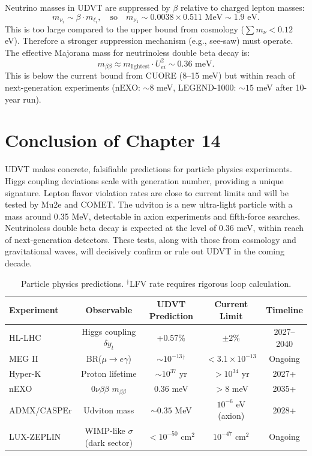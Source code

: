 \documentclass[12pt,a4paper]{book}
\theoremstyle{definition}
\theoremstyle{remark}
\begin{document}
Neutrino masses in UDVT are suppressed by $\beta$ relative to charged lepton masses:
\begin{equation}
    m_{\nu_i} \sim \beta \cdot m_{\ell_i}, \quad \text{so} \quad m_{\nu_1} \sim 0.0038 \times 0.511 \text{ MeV} \sim 1.9 \text{ eV}.
\end{equation}
This is too large compared to the upper bound from cosmology ($\sum m_\nu < 0.12$ eV). Therefore a stronger suppression mechanism (e.g., see-saw) must operate. The effective Majorana mass for neutrinoless double beta decay is:
\begin{equation}
    m_{\beta\beta} \approx m_{\mathrm{lightest}} \cdot U_{ei}^2 \sim 0.36 \text{ meV}.
\end{equation}
This is below the current bound from CUORE (8--15 meV) but within reach of next-generation experiments (nEXO: $\sim 8$ meV, LEGEND-1000: $\sim 15$ meV after 10-year run).

\section{Conclusion of Chapter 14}

UDVT makes concrete, falsifiable predictions for particle physics experiments. Higgs coupling deviations scale with generation number, providing a unique signature. Lepton flavor violation rates are close to current limits and will be tested by Mu2e and COMET. The udviton is a new ultra-light particle with a mass around 0.35 MeV, detectable in axion experiments and fifth-force searches. Neutrinoless double beta decay is expected at the level of 0.36 meV, within reach of next-generation detectors. These tests, along with those from cosmology and gravitational waves, will decisively confirm or rule out UDVT in the coming decade.

\begin{table}[htbp]
\centering
\caption{Particle physics predictions. $^\dagger$LFV rate requires rigorous loop calculation.}
\begin{tabular}{@{}lcccc@{}}
\toprule
\textbf{Experiment} & \textbf{Observable} & \textbf{UDVT Prediction} & \textbf{Current Limit} & \textbf{Timeline} \\
\midrule
HL-LHC & Higgs coupling $\delta y_t$ & +0.57\% & $\pm 2\%$ & 2027--2040 \\
MEG II & BR($\mu \rightarrow e\gamma$) & $\sim 10^{-13}$$^\dagger$ & $< 3.1 \times 10^{-13}$ & Ongoing \\
Hyper-K & Proton lifetime & $\sim 10^{37}$ yr & $> 10^{34}$ yr & 2027+ \\
nEXO & $0\nu\beta\beta$ $m_{\beta\beta}$ & 0.36 meV & $> 8$ meV & 2035+ \\
ADMX/CASPEr & Udviton mass & $\sim 0.35$ MeV & $10^{-6}$ eV (axion) & 2028+ \\
LUX-ZEPLIN & WIMP-like $\sigma$ (dark sector) & $< 10^{-50}$ cm$^2$ & $10^{-47}$ cm$^2$ & Ongoing \\
\bottomrule
\end{tabular}
\end{table}
\end{document}
